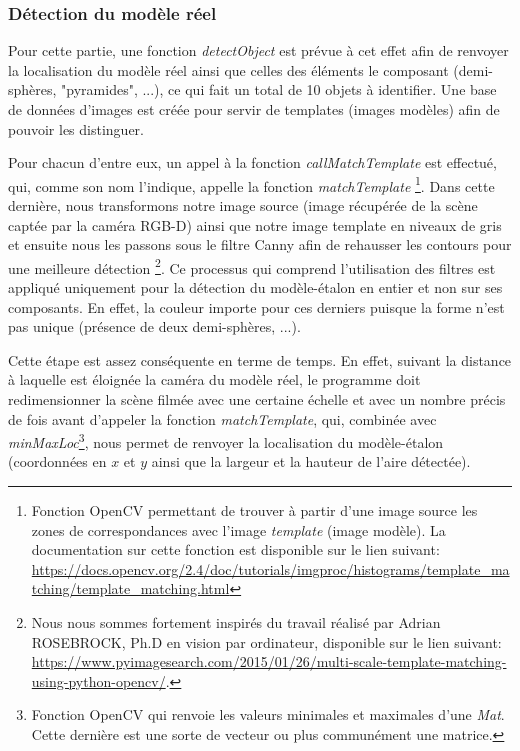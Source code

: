 \documentclass[a4paper, 12pt]{book}
\newcounter{program}[subsection]
\begin{document}
\subsubsection{Détection du modèle réel}  

Pour cette partie, une fonction \emph{detectObject} est prévue à cet effet afin de renvoyer la localisation du modèle réel ainsi que celles des éléments le composant (demi-sphères, "pyramides", ...), ce qui fait un total de 10 objets à identifier. Une base de données d'images est créée pour servir de templates (images modèles) afin de pouvoir les distinguer. \par Pour chacun d'entre eux, un appel à la fonction \emph{callMatchTemplate} est effectué, qui, comme son nom l'indique, appelle la fonction \emph{matchTemplate} \footnote{Fonction OpenCV permettant de trouver à partir d'une image source les zones de correspondances avec l'image \emph{template} (image modèle). La documentation sur cette fonction est disponible sur le lien suivant: \url{https://docs.opencv.org/2.4/doc/tutorials/imgproc/histograms/template_matching/template_matching.html}}. Dans cette dernière, nous transformons notre image source (image récupérée de la scène captée par la caméra RGB-D) ainsi que notre image template en niveaux de gris et ensuite nous les passons sous le filtre Canny afin de rehausser les contours pour une meilleure détection \footnote{Nous nous sommes fortement inspirés du travail réalisé par Adrian ROSEBROCK, Ph.D en vision par ordinateur, disponible sur le lien suivant: \url {https://www.pyimagesearch.com/2015/01/26/multi-scale-template-matching-using-python-opencv/}.}. Ce processus qui comprend l'utilisation des filtres est appliqué uniquement pour la détection du modèle-étalon en entier et non sur ses composants. En effet, la couleur importe pour ces derniers puisque la forme n'est pas unique (présence de deux demi-sphères, ...).
\par Cette étape est assez conséquente en terme de temps. En effet, suivant la distance à laquelle est éloignée la caméra du modèle réel, le programme doit redimensionner la scène filmée avec une certaine échelle et avec un nombre précis de fois avant d'appeler la fonction \emph{matchTemplate}, qui, combinée avec \emph{minMaxLoc}\footnote{Fonction OpenCV qui renvoie les valeurs minimales et maximales d'une \emph{Mat}. Cette dernière est une sorte de vecteur ou plus communément une matrice.}, nous permet de renvoyer la localisation du modèle-étalon (coordonnées en $x$ et $y$ ainsi que la largeur et la hauteur de l'aire détectée). 
\end{document}
